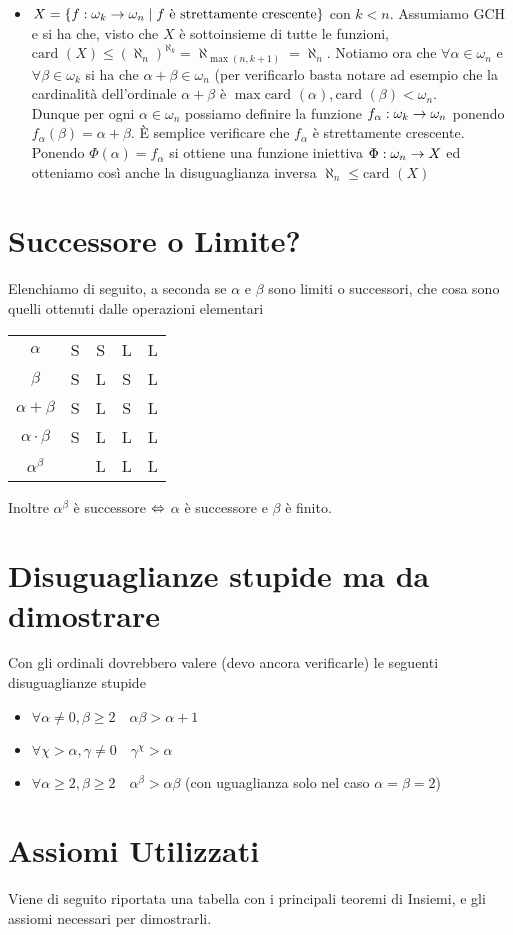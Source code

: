 \documentclass[a4paper,NoNotes,GeneralMath]{stdmdoc}
\newcommand{\card}[1]{\text{card }({#1})}
\begin{document}
\begin{itemize}
		\item $X = \{ f: \omega_k \rightarrow \omega_n \mid f \text{ è strettamente crescente} \}$ con $k < n$. Assumiamo GCH e si ha che, visto che $X$ è sottoinsieme di tutte le funzioni, $\card{X} \le (\aleph_n)^{\aleph_k} = \aleph_{\max(n, k + 1)} = \aleph_n$. Notiamo ora che $\forall \alpha \in \omega_n$ e $\forall \beta \in \omega_k$ si ha che $\alpha + \beta \in \omega_n$ (per verificarlo basta notare ad esempio che la cardinalità dell'ordinale $\alpha + \beta$ è $\max{\card{\alpha}, \card{\beta}} < \omega_n$. \\
			Dunque per ogni $\alpha \in \omega_n$ possiamo definire la funzione $f_\alpha: \omega_k \rightarrow \omega_n$ ponendo $f_\alpha (\beta) = \alpha + \beta$. È semplice verificare che $f_\alpha$ è strettamente crescente. Ponendo $\Phi(\alpha) = f_\alpha$ si ottiene una funzione iniettiva $\Phi: \omega_n \rightarrow X$ ed otteniamo così anche la disuguaglianza inversa $\aleph_n \le \card{X}$
	\end{itemize}
	
	\section*{Successore o Limite?}
	Elenchiamo di seguito, a seconda se $\alpha$ e $\beta$ sono limiti o successori, che cosa sono quelli ottenuti dalle operazioni elementari
	\vskip 0.5cm \begin{tabular}{ccccc}
	$\alpha$             & S & S & L & L \\
	$\beta$              & S & L & S & L \\
	$\alpha + \beta$     & S & L & S & L \\
	$\alpha \cdot \beta$ & S & L & L & L \\
	$\alpha ^ \beta$     &   & L & L & L \\
	\end{tabular} \vskip 0.5cm
	Inoltre $\alpha^\beta$ è successore $\Leftrightarrow$ $\alpha$ è successore e $\beta$ è finito.
	
	\section*{Disuguaglianze stupide ma da dimostrare}
	Con gli ordinali dovrebbero valere (devo ancora verificarle) le seguenti disuguaglianze stupide
	\begin{itemize}
		\item $\forall \alpha \neq 0, \beta \ge 2 \quad \alpha \beta > \alpha + 1$
		\item $\forall \chi > \alpha, \gamma \neq 0 \quad \gamma^\chi > \alpha$
		\item $\forall \alpha \ge 2, \beta \ge 2 \quad \alpha^\beta > \alpha \beta$ (con uguaglianza solo nel caso $\alpha = \beta = 2$)
	\end{itemize}

	
	\section*{Assiomi Utilizzati}
	Viene di seguito riportata una tabella con i principali teoremi di Insiemi, e gli assiomi necessari per dimostrarli.
	
	
\end{document}
